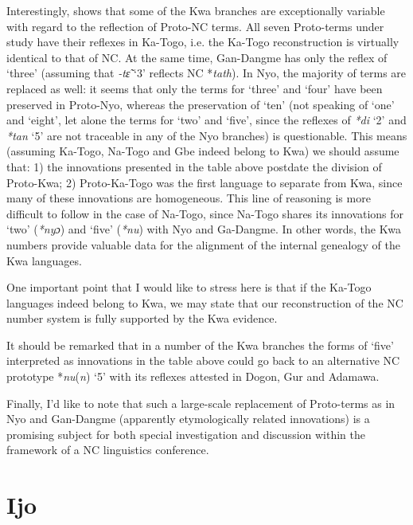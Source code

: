Interestingly,  shows that some of the Kwa branches are exceptionally variable with regard to the reflection of Proto-NC terms. All seven Proto-terms under study have their reflexes in Ka-Togo, i.e. the Ka-Togo reconstruction is virtually identical to that of NC. At the same time, Gan-Dangme has only the reflex of ‘three’ (assuming that \textit{-t{\~{ɛ}}} ‘3’ reflects NC *\textit{tath}). In Nyo, the majority of terms are replaced as well: it seems that only the terms for ‘three’ and ‘four’ have been preserved in Proto-Nyo, whereas the preservation of ‘ten’ (not speaking of ‘one’ and ‘eight’, let alone the terms for ‘two’ and ‘five’, since the reflexes of \textit{*di} ‘2’ and \textit{*tan} ‘5’ are not traceable in any of the Nyo branches) is questionable. This means (assuming Ka-Togo, Na-Togo and Gbe indeed belong to Kwa) we should assume that: 1) the innovations presented in the table above postdate the division of Proto-Kwa; 2) Proto-Ka-Togo was the first language to separate from Kwa, since many of these innovations are homogeneous. This line of reasoning is more difficult to follow in the case of Na-Togo, since Na-Togo shares its innovations for ‘two’ (\textit{*ny}\textit{ɔ}) and ‘five’ (\textit{*nu}) with Nyo and Ga-Dangme. In other words, the Kwa numbers provide valuable data for the alignment of the internal genealogy of the Kwa languages.

One important point that I would like to stress here is that if the Ka-Togo languages indeed belong to Kwa, we may state that our reconstruction of the NC number system is fully supported by the Kwa evidence.  

It should be remarked that in a number of the Kwa branches the forms of ‘five’ interpreted as innovations in the table above could go back to an alternative NC prototype *\textit{nu}(\textit{n}) ‘5’ with its reflexes attested in Dogon, Gur and Adamawa.

Finally, I’d like to note that such a large-scale replacement of Proto-terms as in Nyo and Gan-Dangme (apparently etymologically related innovations) is a promising subject for both special investigation and discussion within the framework of a NC linguistics conference.

\clearpage
\section{Ijo}%

